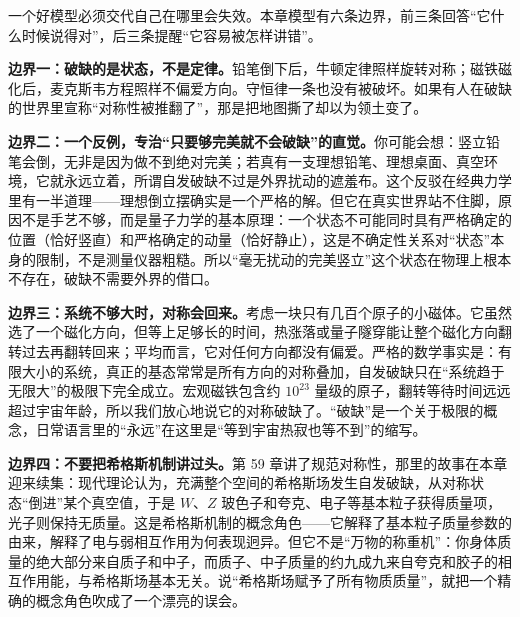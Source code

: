 \begin{center}
\end{center}


\begin{mainline}
一个好模型必须交代自己在哪里会失效。本章模型有六条边界，前三条回答“它什么时候说得对”，后三条提醒“它容易被怎样讲错”。

\textbf{边界一：破缺的是状态，不是定律。}铅笔倒下后，牛顿定律照样旋转对称；磁铁磁化后，麦克斯韦方程照样不偏爱方向。守恒律一条也没有被破坏。如果有人在破缺的世界里宣称“对称性被推翻了”，那是把地图撕了却以为领土变了。

\textbf{边界二：一个反例，专治“只要够完美就不会破缺”的直觉。}你可能会想：竖立铅笔会倒，无非是因为做不到绝对完美；若真有一支理想铅笔、理想桌面、真空环境，它就永远立着，所谓自发破缺不过是外界扰动的遮羞布。这个反驳在经典力学里有一半道理——理想倒立摆确实是一个严格的解。但它在真实世界站不住脚，原因不是手艺不够，而是量子力学的基本原理：一个状态不可能同时具有严格确定的位置（恰好竖直）和严格确定的动量（恰好静止），这是不确定性关系对“状态”本身的限制，不是测量仪器粗糙。所以“毫无扰动的完美竖立”这个状态在物理上根本不存在，破缺不需要外界的借口。

\textbf{边界三：系统不够大时，对称会回来。}考虑一块只有几百个原子的小磁体。它虽然选了一个磁化方向，但等上足够长的时间，热涨落或量子隧穿能让整个磁化方向翻转过去再翻转回来；平均而言，它对任何方向都没有偏爱。严格的数学事实是：有限大小的系统，真正的基态常常是所有方向的对称叠加，自发破缺只在“系统趋于无限大”的极限下完全成立。宏观磁铁包含约 \(10^{23}\) 量级的原子，翻转等待时间远远超过宇宙年龄，所以我们放心地说它的对称破缺了。“破缺”是一个关于极限的概念，日常语言里的“永远”在这里是“等到宇宙热寂也等不到”的缩写。

\textbf{边界四：不要把希格斯机制讲过头。}第 59 章讲了规范对称性，那里的故事在本章迎来续集：现代理论认为，充满整个空间的希格斯场发生自发破缺，从对称状态“倒进”某个真空值，于是 \(W\)、\(Z\) 玻色子和夸克、电子等基本粒子获得质量项，光子则保持无质量。这是希格斯机制的概念角色——它解释了基本粒子质量参数的由来，解释了电与弱相互作用为何表现迥异。但它不是“万物的称重机”：你身体质量的绝大部分来自质子和中子，而质子、中子质量的约九成九来自夸克和胶子的相互作用能，与希格斯场基本无关。说“希格斯场赋予了所有物质质量”，就把一个精确的概念角色吹成了一个漂亮的误会。


\end{mainline}
